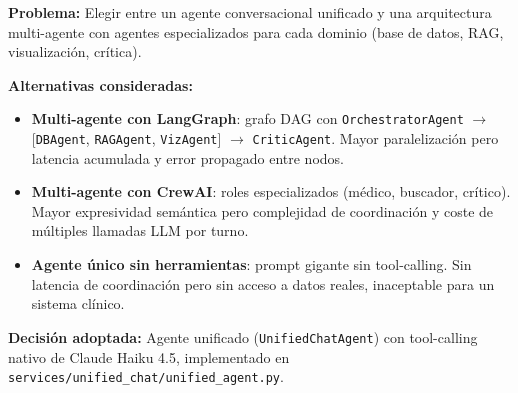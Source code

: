 \begin{tcolorbox}[
  enhanced, breakable,
  colback=orange!6, colframe=orange!60,
  title={\small\sffamily\bfseries\color{white} Decisión Arquitectónica Central — Agente Unificado vs.\ Arquitectura Multi-Agente},
  attach boxed title to top left={yshift=-2mm, xshift=4mm},
  boxed title style={colback=orange!70, rounded corners},
  left=5pt, right=5pt, top=5pt, bottom=5pt
]
\footnotesize
\textbf{Problema:} Elegir entre un agente conversacional unificado y una arquitectura multi-agente con agentes especializados para cada dominio (base de datos, RAG, visualización, crítica).

\textbf{Alternativas consideradas:}
\begin{itemize}[nosep, leftmargin=*]
  \item \textbf{Multi-agente con LangGraph}: grafo DAG con \texttt{OrchestratorAgent} $\rightarrow$ [\texttt{DBAgent}, \texttt{RAGAgent}, \texttt{VizAgent}] $\rightarrow$ \texttt{CriticAgent}. Mayor paralelización pero latencia acumulada y error propagado entre nodos.
  \item \textbf{Multi-agente con CrewAI}: roles especializados (médico, buscador, crítico). Mayor expresividad semántica pero complejidad de coordinación y coste de múltiples llamadas LLM por turno.
  \item \textbf{Agente único sin herramientas}: prompt gigante sin tool-calling. Sin latencia de coordinación pero sin acceso a datos reales, inaceptable para un sistema clínico.
\end{itemize}

\textbf{Decisión adoptada:} Agente unificado (\texttt{UnifiedChatAgent}) con tool-calling nativo de Claude Haiku 4.5, implementado en \texttt{services/unified\_chat/unified\_agent.py}.


\end{tcolorbox}
